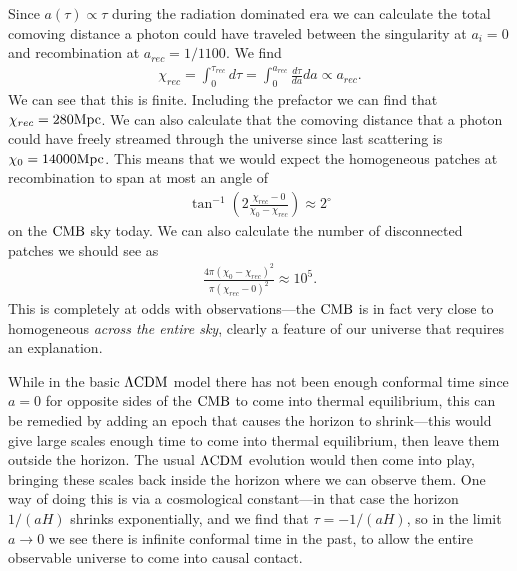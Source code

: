     Since $a(\tau)\propto \tau$ during the radiation dominated era we can calculate
    the total comoving distance a photon could have traveled between the singularity at $a_i=0$
    and recombination at $a_{rec}=1/1100$. We find
    \begin{align}
        \chi_{rec} = \int_{0}^{\tau_{rec}} d \tau = \int_{0}^{a_{rec}} \frac{d\tau}{da}da \propto a_{rec}.
    \end{align}
    We can see that this is finite.
    Including the prefactor we can find that $\chi_{rec}=280\text{Mpc}$.
    We can also calculate that the comoving distance that a photon could have
    freely streamed through the universe since
    last scattering is $\chi_0=14000\text{Mpc}$.
    This means that we would expect the homogeneous patches at recombination to span
    at most an angle of
    \begin{align}
        \tan^{-1}\left(2\frac{\chi_{rec}-0}{\chi_{0}-\chi_{rec}}\right) \approx 2^{\circ}
    \end{align}
    on the $\text{CMB}$ sky today. We can also calculate the number of disconnected patches
    we should see as
    \begin{align}
        \frac{4\pi(\chi_{0}-\chi_{rec})^2}{\pi(\chi_{rec}-0)^2} \approx 10^5.
    \end{align}
    This is completely at odds with observations---the $\text{CMB}$ is in fact very close to
    homogeneous \textit{across the entire sky}, clearly a feature of our universe
    that requires an explanation.


    While in the basic $\Lambda\text{CDM}$ model there has not been enough conformal time since $a=0$ for
    opposite sides of the $\text{CMB}$ to come into thermal equilibrium, this can be remedied by
    adding an epoch that causes the horizon to shrink---this would give large scales enough time
    to come into thermal equilibrium, then leave them outside the horizon. The usual $\Lambda\text{CDM}$ evolution
    would then come into play, bringing these scales back inside the horizon where we can observe them.
    One way of doing this is via a cosmological constant---in that case the horizon $1/(aH)$ shrinks
    exponentially, and we find that $\tau=-1/(aH)$, so in the limit $a\rightarrow 0$ we see there is
    infinite conformal time in the past, to allow the entire observable universe to come into
    causal contact.



